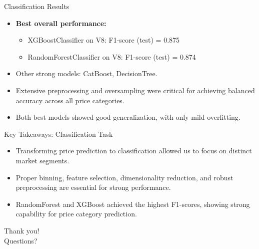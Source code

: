 \documentclass{beamer}
\begin{document}
\begin{frame}{Classification Results}
    \begin{itemize}
        \item \textbf{Best overall performance:}
        \begin{itemize}
            \item XGBoostClassifier on V8: F1-score (test) = 0.875
            \item RandomForestClassifier on V8: F1-score (test) = 0.874
        \end{itemize}
        \item Other strong models: CatBoost, DecisionTree.
        \item Extensive preprocessing and oversampling were critical for achieving balanced accuracy across all price categories.
        \item Both best models showed good generalization, with only mild overfitting.
    \end{itemize}
\end{frame}


\begin{frame}{Key Takeaways: Classification Task}
    \begin{itemize}
        \item Transforming price prediction to classification allowed us to focus on distinct market segments.
        \item Proper binning, feature selection, dimensionality reduction, and robust preprocessing are essential for strong performance.
        \item RandomForest and XGBoost achieved the highest F1-scores, showing strong capability for price category prediction.
    \end{itemize}
\end{frame}

\begin{frame}
    \centering
    \Huge
    Thank you! \\
    Questions?
\end{frame}
\end{document}
